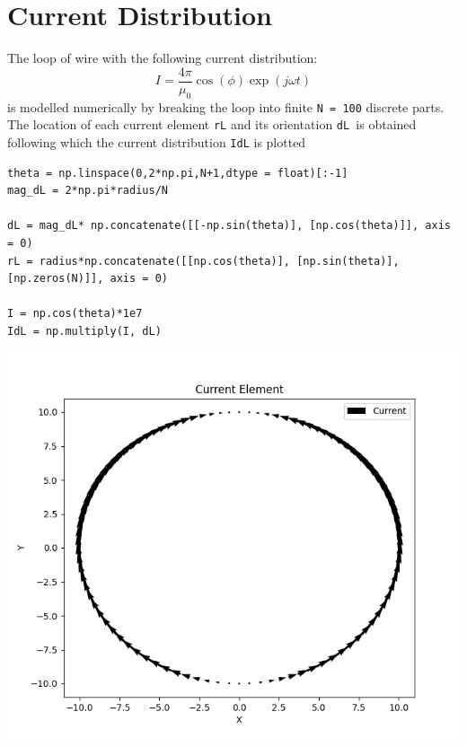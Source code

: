 \documentclass[12pt, a4paper]{report}
\begin{document}
\section*{Current Distribution}
The loop of wire with the following current distribution:
\begin{equation*}
I = \frac{4\pi}{\mu_0}\cos({\phi})\exp({j\omega t})
\end{equation*}
is modelled numerically by breaking the loop into finite \texttt{N = 100} discrete parts. The location of each current element \texttt{rL} and its orientation \texttt{dL }is obtained following which the current distribution \texttt{IdL} is plotted

\begin{verbatim}
theta = np.linspace(0,2*np.pi,N+1,dtype = float)[:-1]
mag_dL = 2*np.pi*radius/N           

dL = mag_dL* np.concatenate([[-np.sin(theta)], [np.cos(theta)]], axis = 0)
rL = radius*np.concatenate([[np.cos(theta)], [np.sin(theta)], [np.zeros(N)]], axis = 0)

I = np.cos(theta)*1e7               
IdL = np.multiply(I, dL)            
\end{verbatim}

\begin{center}
	\includegraphics[scale=0.75]{Figure_1.png} 
	\label{fig:rawdata}
\end{center}
\clearpage
\end{document}
